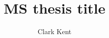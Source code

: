 \documentclass[12pt]{ozuthesis}
\title{MS thesis title}
\author{Clark Kent}
\begin{document}


\begin{frontmatter}
    
    
    
    \makeTOC
    \makeListOfTables
    \makeListOfFigures
    
\end{frontmatter}

\begin{thesisbody}
    
    
    
    \makeBibliography
    
\end{thesisbody}
\end{document}
